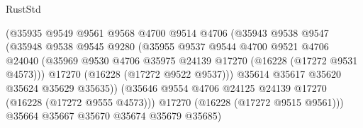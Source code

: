 \begin{lexlean}{RustStd}
\begin{coremodule}
                                      (@35935
                                        @9549
                                        @9561
                                        @9568
                                        @4700
                                        @9514
                                        @4706
                                        (@35943
                                          @9538
                                          @9547
                                          (@35948
                                            @9538
                                            @9545
                                            @9280
                                            (@35955
                                              @9537
                                              @9544
                                              @4700
                                              @9521
                                              @4706
                                              @24040
                                              (@35969
                                                @9530
                                                @4706
                                                @35975
                                                @24139
                                                @17270
                                                (@16228 (@17272 @9531 @4573)))
                                              @17270
                                              (@16228 (@17272 @9522 @9537)))
                                            @35614
                                            @35617
                                            @35620
                                            @35624
                                            @35629
                                            @35635))
                                        (@35646
                                          @9554
                                          @4706
                                          @24125
                                          @24139
                                          @17270
                                          (@16228 (@17272 @9555 @4573)))
                                        @17270
                                        (@16228 (@17272 @9515 @9561)))
                                      @35664
                                      @35667
                                      @35670
                                      @35674
                                      @35679
                                      @35685)

\end{coremodule}
\end{lexlean}

